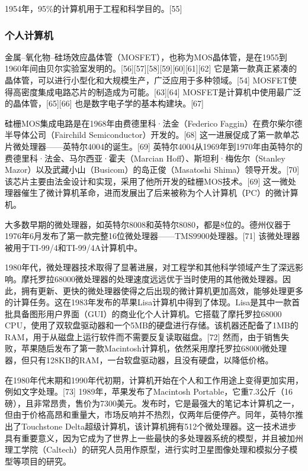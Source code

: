 1954年，95\%的计算机用于工程和科学目的。[55]
\subsubsection{个人计算机}  
金属–氧化物–硅场效应晶体管（MOSFET），也称为MOS晶体管，是在1955到1960年间由贝尔实验室发明的。[56][57][58][59][60][61][62] 它是第一款真正紧凑的晶体管，可以进行小型化和大规模生产，广泛应用于多种领域。[54] MOSFET使得高密度集成电路芯片的制造成为可能。[63][64] MOSFET是计算机中使用最广泛的晶体管，[65][66] 也是数字电子学的基本构建块。[67]

硅栅MOS集成电路是在1968年由费德里科·法金（Federico Faggin）在费尔柴尔德半导体公司（Fairchild Semiconductor）开发的。[68] 这一进展促成了第一款单芯片微处理器——英特尔4004的诞生。[69] 英特尔4004从1969年到1970年由英特尔的费德里科·法金、马尔西亚·霍夫（Marcian Hoff）、斯坦利·梅佐尔（Stanley Mazor）以及武藏小山（Busicom）的岛正俊（Masatoshi Shima）领导开发。[70] 该芯片主要由法金设计和实现，采用了他所开发的硅栅MOS技术。[69] 这一微处理器催生了微计算机革命，进而发展出了后来被称为个人计算机（PC）的微计算机。

大多数早期的微处理器，如英特尔8008和英特尔8080，都是8位的。德州仪器于1976年6月发布了第一款完整16位微处理器——TMS9900处理器。[71] 该微处理器被用于TI-99/4和TI-99/4A计算机中。

1980年代，微处理器技术取得了显著进展，对工程学和其他科学领域产生了深远影响。摩托罗拉68000微处理器的处理速度远远优于当时使用的其他微处理器。因此，拥有更新、更快的微处理器使得之后出现的微计算机更加高效，能够处理更多的计算任务。这在1983年发布的苹果Lisa计算机中得到了体现。Lisa是其中一款首批具备图形用户界面（GUI）的商业化个人计算机。它搭载了摩托罗拉68000 CPU，使用了双软盘驱动器和一个5MB的硬盘进行存储。该机器还配备了1MB的RAM，用于从磁盘上运行软件而不需要反复读取磁盘。[72] 然而，由于销售失败，苹果随后发布了第一款Macintosh计算机，依然采用摩托罗拉68000微处理器，但只有128KB的RAM，一台软盘驱动器，且没有硬盘，以降低价格。

在1980年代末期和1990年代初期，计算机开始在个人和工作用途上变得更加实用，例如文字处理。[73] 1989年，苹果发布了Macintosh Portable，它重7.3公斤（16磅），且非常昂贵，售价为7300美元。发布时，它是最强大的笔记本计算机之一，但由于价格高昂和重量大，市场反响并不热烈，仅两年后便停产。同年，英特尔推出了Touchstone Delta超级计算机，该计算机拥有512个微处理器。这一技术进步具有重要意义，因为它成为了世界上一些最快的多处理器系统的模型，并且被加州理工学院（Caltech）的研究人员用作原型，进行实时卫星图像处理和模拟分子模型等项目的研究。
